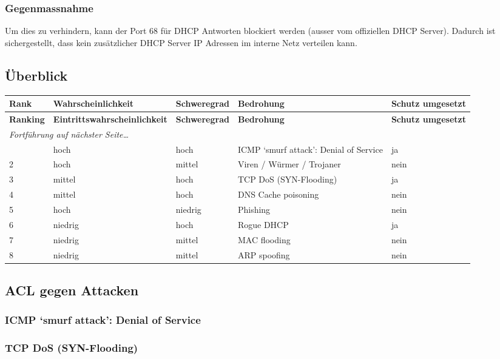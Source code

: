 \documentclass[11pt,a4paper,parskip=half]{scrartcl}
\begin{document}
\subsubsection{Gegenmassnahme}
Um dies zu verhindern, kann der Port 68 für DHCP Antworten blockiert werden (ausser vom offiziellen DHCP Server). Dadurch ist sichergestellt, dass kein zusätzlicher DHCP Server IP Adressen im interne Netz verteilen kann.

\subsection{Überblick}
\begin{longtable}{p{1.4cm}|p{3.9cm}|p{2.6cm}|p{4cm}|p{2cm}}
	\textbf{Rank} & \textbf{Wahrscheinlichkeit} & \textbf{Schweregrad} & \textbf{Bedrohung} & \textbf{Schutz umgesetzt}\\
	\hline
	\endfirsthead
	\textbf{Ranking} & \textbf{Eintrittswahrscheinlichkeit} & \textbf{Schweregrad} & \textbf{Bedrohung} & \textbf{Schutz umgesetzt}\\
	\hline
	\endhead
	\hline
	\multicolumn{2}{l}{\textit{Fortführung auf nächster Seite\ldots}} \\
	\endfoot
	\endlastfoot
	1 & hoch & hoch & ICMP ‘smurf attack’: Denial of Service & ja\\
	2 & hoch & mittel & Viren / Würmer / Trojaner & nein\\
	3 & mittel & hoch & TCP DoS (SYN-Flooding) & ja\\
	4 & mittel & hoch & DNS Cache poisoning & nein\\
	5 & hoch & niedrig & Phishing & nein\\
	6 & niedrig & hoch & Rogue DHCP & ja\\
	7 & niedrig & mittel & MAC flooding & nein\\
	8 & niedrig & mittel & ARP spoofing & nein\\
\end{longtable}

\subsection{ACL gegen Attacken}
\subsubsection{ICMP ‘smurf attack’: Denial of Service}


\subsubsection{TCP DoS (SYN-Flooding)}
\end{document}
